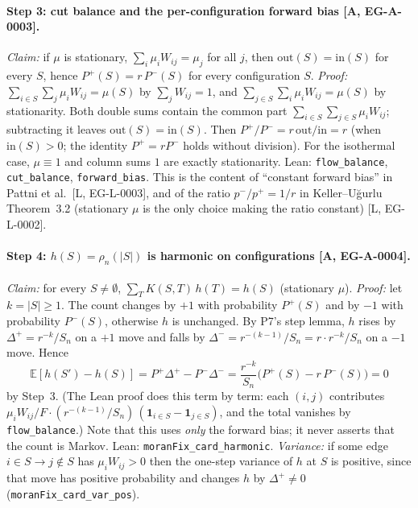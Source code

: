 \documentclass[11pt]{article}
\newcommand{\tier}[1]{\textsf{[#1]}}
\newcommand{\lean}[1]{\texttt{#1}}
\newcommand{\rhoF}{\rho_n}
\begin{document}


\paragraph{Step 3: cut balance and the per-configuration forward bias \tier{A, EG-A-0003}.} \emph{Claim:} if $\mu$ is stationary, $\sum_i\mu_iW_{ij}=\mu_j$ for all $j$, then $\mathrm{out}(S)=\mathrm{in}(S)$ for every $S$, hence $P^{+}(S)=r\,P^{-}(S)$ for every configuration $S$. \emph{Proof:}
$\sum_{i\in S}\sum_{j}\mu_iW_{ij}=\mu(S)$ by $\sum_jW_{ij}=1$, and $\sum_{j\in S}\sum_i\mu_iW_{ij}=\mu(S)$ by stationarity. Both double sums contain the common part $\sum_{i\in S}\sum_{j\in S}\mu_iW_{ij}$; subtracting it leaves $\mathrm{out}(S)=\mathrm{in}(S)$. Then $P^{+}/P^{-}=r\,\mathrm{out}/\mathrm{in}=r$ (when $\mathrm{in}(S)>0$; the identity $P^{+}=rP^{-}$ holds without division).
For the isothermal case, $\mu\equiv1$ and column sums $1$ are exactly stationarity. Lean: \lean{flow\_balance}, \lean{cut\_balance}, \lean{forward\_bias}. This is the content of ``constant forward bias'' in Pattni et al.\ \tier{L, EG-L-0003}, and of the ratio $p^{-}/p^{+}=1/r$ in Keller--U\u{g}urlu Theorem~3.2 (stationary $\mu$ is the only choice making the ratio constant) \tier{L, EG-L-0002}.

\paragraph{Step 4: $h(S)=\rhoF(|S|)$ is harmonic on configurations \tier{A, EG-A-0004}.} \emph{Claim:} for every $S\neq\emptyset$, $\sum_TK(S,T)\,h(T)=h(S)$ (stationary $\mu$). \emph{Proof:} let $k=|S|\ge1$. The count changes by $+1$ with probability $P^{+}(S)$ and by $-1$ with probability $P^{-}(S)$, otherwise $h$ is unchanged. By P7's step lemma, $h$ rises by $\Delta^{+}=r^{-k}/S_n$ on a $+1$ move and falls by $\Delta^{-}=r^{-(k-1)}/S_n=r\cdot r^{-k}/S_n$ on a $-1$ move. Hence
\[
\mathbb E[h(S')-h(S)]=P^{+}\Delta^{+}-P^{-}\Delta^{-}=\frac{r^{-k}}{S_n}\bigl(P^{+}(S)-r\,P^{-}(S)\bigr)=0
\]
by Step~3. (The Lean proof does this term by term: each $(i,j)$ contributes $\mu_iW_{ij}/F\cdot(r^{-(k-1)}/S_n)\,(\mathbf 1_{i\in S}-\mathbf 1_{j\in S})$, and the total vanishes by \lean{flow\_balance}.) Note that this uses \emph{only} the forward bias; it never asserts that the count is Markov.
Lean: \lean{moranFix\_card\_harmonic}. \emph{Variance:} if some edge $i\in S\to j\notin S$ has $\mu_iW_{ij}>0$ then the one-step variance of $h$ at $S$ is positive, since that move has positive probability and changes $h$ by $\Delta^{+}\neq0$ (\lean{moranFix\_card\_var\_pos}).
\end{document}
